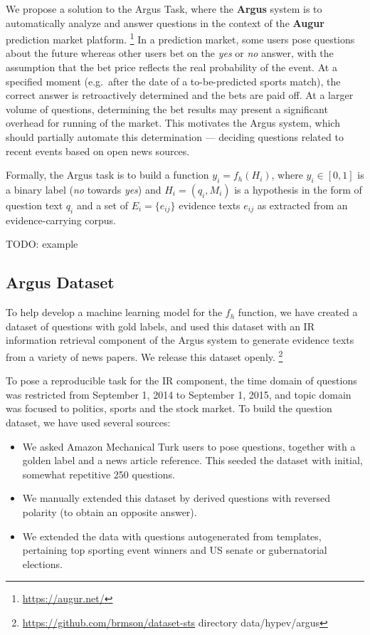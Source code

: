 \documentclass[11pt]{article}
\begin{document}
We propose a solution to the Argus Task, where
the \textbf{Argus} system \cite{arguswp} \cite{argus}
is to automatically analyze and answer questions
in the context of the \textbf{Augur} prediction market platform.%
\footnote{\url{https://augur.net/}}
In a prediction market, some users pose questions about the future
whereas other users bet on the \textit{yes} or \textit{no} answer,
with the assumption that the bet price reflects the real probability
of the event.  At a specified moment (e.g.\ after the date of a to-be-predicted sports match), the
correct answer is retroactively determined and the bets are paid off.
At a larger volume of questions, determining the bet results may
present a significant overhead for running of the market.
This motivates the Argus system, which should partially automate
this determination --- deciding questions related to recent events
based on open news sources.

Formally, the Argus task is to build a function $y_i = f_h(H_i)$,
where $y_i \in [0,1]$ is a binary label (\textit{no} towards \textit{yes})
and $H_i = (q_i, M_i)$ is a hypothesis in the form of question text $q_i$
and a set of $E_i = \{e_{ij}\}$ evidence texts $e_{ij}$ as extracted
from an evidence-carrying corpus.

TODO: example


\subsection{Argus Dataset}

To help develop a machine learning model for the $f_h$ function,
we have created a dataset of questions with gold labels, and used
this dataset with an IR information retrieval component of the Argus
system to generate evidence texts from a variety of news papers.
We release this dataset openly.%
\footnote{\url{https://github.com/brmson/dataset-sts} directory data/hypev/argus}

To pose a reproducible task for the IR component, the time domain
of questions was restricted from September 1, 2014 to September 1, 2015,
and topic domain was focused to politics, sports and the stock market.
To build the question dataset, we have used several sources:
\begin{itemize}
	\item We asked Amazon Mechanical Turk users to pose questions, together with a golden label and a news article reference.
		This seeded the dataset with initial, somewhat repetitive 250 questions.
	\item We manually extended this dataset by derived questions with reversed polarity (to obtain an opposite answer).
	\item We extended the data with questions autogenerated from templates, pertaining top sporting event winners and US senate or gubernatorial elections.
\end{itemize}
\end{document}
